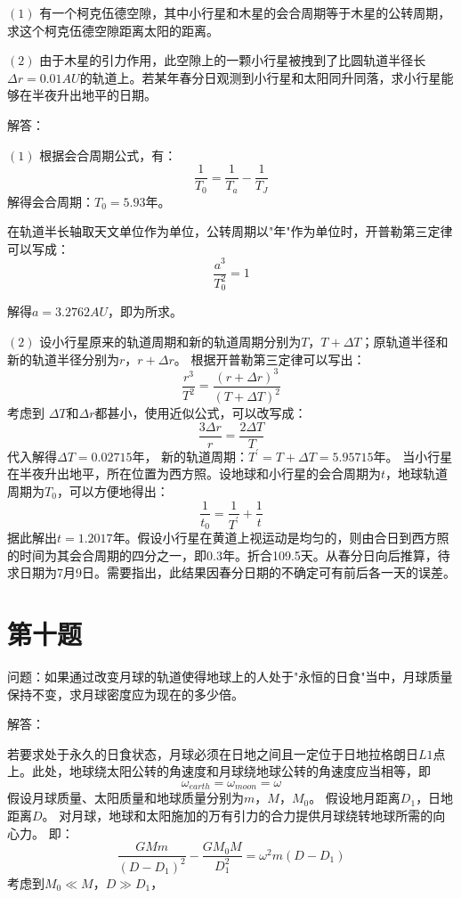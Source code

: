 \documentclass[a4paper,12pt]{report}
\begin{document}
$\left(1\right)$
有一个柯克伍德空隙，其中小行星和木星的会合周期等于木星的公转周期，求这个柯克伍德空隙距离太阳的距离。

$\left(2\right)$
由于木星的引力作用，此空隙上的一颗小行星被拽到了比圆轨道半径长$\Delta r = 0.01AU $的轨道上。若某年春分日观测到小行星和太阳同升同落，求小行星能够在半夜升出地平的日期。

\noindent 解答：

\noindent $\left(1\right)$
根据会合周期公式，有：
\begin{equation}
	\frac{1}{T_{0}}=\frac{1}{T_{a}}-\frac{1}{T_{J}}
\end{equation}
解得会合周期：$T_{0}=5.93$年。

在轨道半长轴取天文单位作为单位，公转周期以"年"作为单位时，开普勒第三定律可以写成：
\begin{equation}
	\frac{a^{3}}{T_{0}^2}=1
\end{equation}

解得$a=3.2762AU$，即为所求。

\noindent $\left(2\right)$
设小行星原来的轨道周期和新的轨道周期分别为$T$，$T+\Delta T$；原轨道半径和新的轨道半径分别为$r$，$r+\Delta r$。
根据开普勒第三定律可以写出：
\begin{equation}
	\frac{r^3}{T^2}=\frac{(r+\Delta r)^{3}}{(T+\Delta T)^{2}}
\end{equation}
考虑到 $\Delta T$和$\Delta r$都甚小，使用近似公式，可以改写成：
\begin{equation}
	\frac{3\Delta r}{r}=\frac{2\Delta T}{T}
\end{equation}
代入解得$\Delta T=0.02715$年，
新的轨道周期：$T^\prime =T+\Delta T=5.95715$年。
当小行星在半夜升出地平，所在位置为西方照。设地球和小行星的会合周期为$t$，地球轨道周期为$T_{0}$，可以方便地得出：
\begin{equation}
	\frac{1}{t_{0}}=\frac{1}{T^\prime}+\frac{1}{t}
\end{equation}
据此解出$t=1.2017$年。假设小行星在黄道上视运动是均匀的，则由合日到西方照的时间为其会合周期的四分之一，即0.3年。折合109.5天。从春分日向后推算，待求日期为7月9日。需要指出，此结果因春分日期的不确定可有前后各一天的误差。
\section{第十题}
\noindent 问题：如果通过改变月球的轨道使得地球上的人处于"永恒的日食"当中，月球质量保持不变，求月球密度应为现在的多少倍。

\noindent 解答：

若要求处于永久的日食状态，月球必须在日地之间且一定位于日地拉格朗日$L1$点上。此处，地球绕太阳公转的角速度和月球绕地球公转的角速度应当相等，即
\begin{equation}
	\omega_{earth}=\omega_{moon}=\omega
\end{equation}
假设月球质量、太阳质量和地球质量分别为$m$，$M$，$M_{0}$。
假设地月距离$D_{1}$，日地距离$D$。
对月球，地球和太阳施加的万有引力的合力提供月球绕转地球所需的向心力。
即：
\begin{equation}
	\frac{GMm}{(D-D_{1})^2}-\frac{GM_{0}M}{D_1^{2}}=\omega^2m(D-D_{1})
\end{equation}
考虑到$M_{0} \ll M$，$D \gg D_{1}$，
\end{document}
